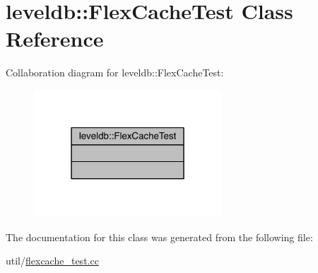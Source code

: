\hypertarget{classleveldb_1_1_flex_cache_test}{}\section{leveldb\+:\+:Flex\+Cache\+Test Class Reference}
\label{classleveldb_1_1_flex_cache_test}


Collaboration diagram for leveldb\+:\+:Flex\+Cache\+Test\+:\nopagebreak
\begin{figure}[H]
\begin{center}
\leavevmode
\includegraphics[width=199pt]{classleveldb_1_1_flex_cache_test__coll__graph}
\end{center}
\end{figure}


The documentation for this class was generated from the following file\+:\begin{DoxyCompactItemize}
\item 
util/\hyperlink{flexcache__test_8cc}{flexcache\+\_\+test.\+cc}\end{DoxyCompactItemize}
